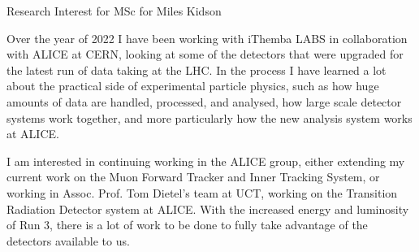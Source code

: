 \documentclass[11pt]{article}
\numberwithin{equation}{section}
\numberwithin{figure}{section}
\numberwithin{table}{section}
\begin{document}
\begin{center}
    {\Large Research Interest for MSc for Miles Kidson}

\end{center}

Over the year of 2022 I have been working with iThemba LABS in collaboration with ALICE at CERN, looking at some of the detectors that were upgraded for the latest run of data taking at the LHC. In the process I have learned a lot about the practical side of experimental particle physics, such as how huge amounts of data are handled, processed, and analysed, how large scale detector systems work together, and more particularly how the new analysis system works at ALICE.

I am interested in continuing working in the ALICE group, either extending my current work on the Muon Forward Tracker and Inner Tracking System, or working in Assoc. Prof. Tom Dietel's team at UCT, working on the Transition Radiation Detector system at ALICE. With the increased energy and luminosity of Run 3, there is a lot of work to be done to fully take advantage of the detectors available to us.  
\end{document}
